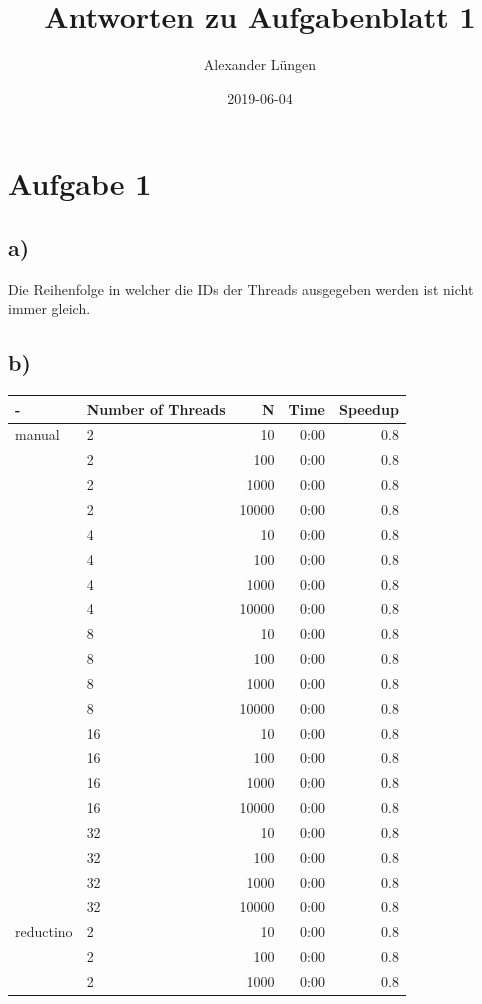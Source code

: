 \documentclass{article}
\title{Antworten zu Aufgabenblatt 1}
\date{2019-06-04}
\author{Alexander Lüngen}
\begin{document}
    \maketitle
    \newpage
    \section{Aufgabe 1}
        \subsection{a)}
        Die Reihenfolge in welcher die IDs der Threads ausgegeben werden ist nicht immer gleich.
        \subsection{b)}
	\begin{tabular}{|l|l|r|r|r|}
		\hline
		- & Number of Threads & N & Time & Speedup \\
		\hline
		manual & 2 & 10 & 0:00 & 0.8 \\
		 & 2 & 100 & 0:00 & 0.8 \\
		 & 2 & 1000 & 0:00 & 0.8 \\
		 & 2 & 10000 & 0:00 & 0.8 \\
		 & 4 & 10 & 0:00 & 0.8 \\
		 & 4 & 100 & 0:00 & 0.8 \\
		 & 4 & 1000 & 0:00 & 0.8 \\
		 & 4 & 10000 & 0:00 & 0.8 \\
		 & 8 & 10 & 0:00 & 0.8 \\
		 & 8 & 100 & 0:00 & 0.8 \\
		 & 8 & 1000 & 0:00 & 0.8 \\
		 & 8 & 10000 & 0:00 & 0.8 \\
		 & 16 & 10 & 0:00 & 0.8 \\
		 & 16 & 100 & 0:00 & 0.8 \\
		 & 16 & 1000 & 0:00 & 0.8 \\
		 & 16 & 10000 & 0:00 & 0.8 \\
		 & 32 & 10 & 0:00 & 0.8 \\
		 & 32 & 100 & 0:00 & 0.8 \\
		 & 32 & 1000 & 0:00 & 0.8 \\
		 & 32 & 10000 & 0:00 & 0.8 \\
		\hline
		reductino & 2 & 10 & 0:00 & 0.8 \\
		 & 2 & 100 & 0:00 & 0.8 \\
		 & 2 & 1000 & 0:00 & 0.8 \\

\end{tabular}
\end{document}
